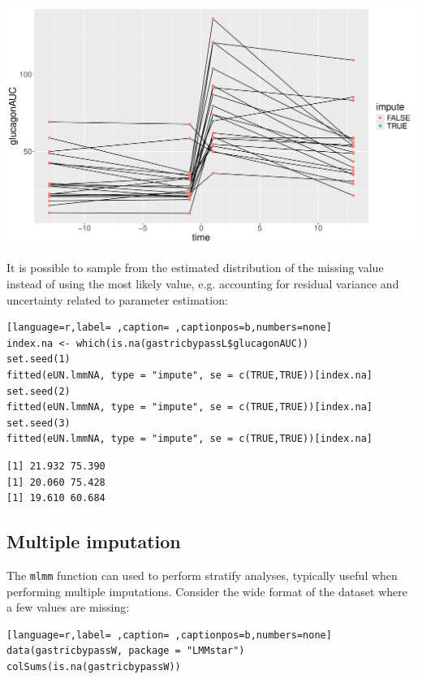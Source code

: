 \documentclass[12pt]{article}
\begin{document}
\begin{center}
\includegraphics[trim={0 0 0 0},width=1\textwidth]{./figures/imputation.pdf}
\end{center}

It is possible to sample from the estimated distribution of the
missing value instead of using the most likely value, e.g. accounting
for residual variance and uncertainty related to parameter estimation:
\begin{lstlisting}[language=r,label= ,caption= ,captionpos=b,numbers=none]
index.na <- which(is.na(gastricbypassL$glucagonAUC))
set.seed(1)
fitted(eUN.lmmNA, type = "impute", se = c(TRUE,TRUE))[index.na]
set.seed(2)
fitted(eUN.lmmNA, type = "impute", se = c(TRUE,TRUE))[index.na]
set.seed(3)
fitted(eUN.lmmNA, type = "impute", se = c(TRUE,TRUE))[index.na]
\end{lstlisting}

\begin{verbatim}
[1] 21.932 75.390
[1] 20.060 75.428
[1] 19.610 60.684
\end{verbatim}


\clearpage

\subsection{Multiple imputation}
\label{sec:org612ce29}

The \texttt{mlmm} function can used to perform stratify analyses, typically
useful when performing multiple imputations. Consider the wide format
of the dataset where a few values are missing:
\begin{lstlisting}[language=r,label= ,caption= ,captionpos=b,numbers=none]
data(gastricbypassW, package = "LMMstar")
colSums(is.na(gastricbypassW))
\end{lstlisting}
\end{document}
